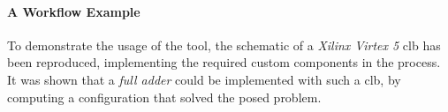 	\paragraph{A Workflow Example}
	To demonstrate the usage of the tool, the schematic of a \emph{Xilinx Virtex 5} \gls{clb} has been reproduced, implementing the required custom components in the process.
	 It was shown that a \emph{full adder} could be implemented with such a \gls{clb}, by computing a configuration that solved the posed problem.